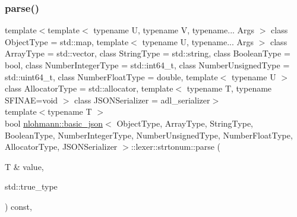 \subsubsection{\texorpdfstring{parse()}{parse()}\hspace{0.1cm}{\footnotesize\ttfamily [2/2]}}
{\footnotesize\ttfamily template$<$template$<$ typename U, typename V, typename... Args $>$ class Object\+Type = std\+::map, template$<$ typename U, typename... Args $>$ class Array\+Type = std\+::vector, class String\+Type  = std\+::string, class Boolean\+Type  = bool, class Number\+Integer\+Type  = std\+::int64\+\_\+t, class Number\+Unsigned\+Type  = std\+::uint64\+\_\+t, class Number\+Float\+Type  = double, template$<$ typename U $>$ class Allocator\+Type = std\+::allocator, template$<$ typename T, typename S\+F\+I\+N\+A\+E=void $>$ class J\+S\+O\+N\+Serializer = adl\+\_\+serializer$>$ \\
template$<$typename T $>$ \\
bool \hyperlink{classnlohmann_1_1basic__json}{nlohmann\+::basic\+\_\+json}$<$ Object\+Type, Array\+Type, String\+Type, Boolean\+Type, Number\+Integer\+Type, Number\+Unsigned\+Type, Number\+Float\+Type, Allocator\+Type, J\+S\+O\+N\+Serializer $>$\+::lexer\+::strtonum\+::parse (\begin{DoxyParamCaption}\item[{T \&}]{value,  }\item[{std\+::true\+\_\+type}]{ }\end{DoxyParamCaption}) const\hspace{0.3cm}{\ttfamily [inline]}, {\ttfamily [private]}}

\mbox{\label{structnlohmann_1_1basic__json_1_1lexer_1_1strtonum_a3c5beafdf848370feedbb7792b6cb397}} 
